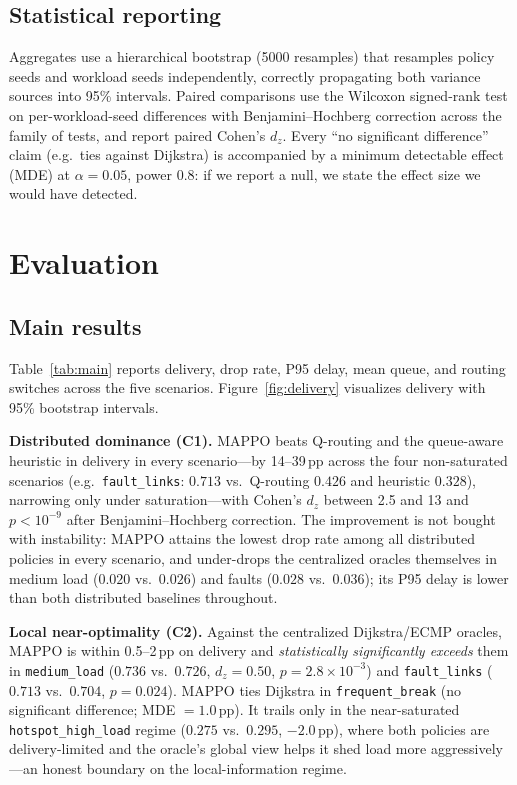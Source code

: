 \documentclass[conference,10pt]{IEEEtran}
\begin{document}
\subsection{Statistical reporting}
Aggregates use a hierarchical bootstrap (5000 resamples) that resamples policy seeds and workload seeds independently, correctly propagating both variance sources into 95\% intervals. Paired comparisons use the Wilcoxon signed-rank test on per-workload-seed differences with Benjamini--Hochberg correction across the family of tests, and report paired Cohen's $d_z$. Every ``no significant difference'' claim (e.g.\ ties against Dijkstra) is accompanied by a minimum detectable effect (MDE) at $\alpha=0.05$, power $0.8$: if we report a null, we state the effect size we would have detected.

\section{Evaluation}
\label{sec:eval}

\subsection{Main results}
Table~\ref{tab:main} reports delivery, drop rate, P95 delay, mean queue, and routing switches across the five scenarios. Figure~\ref{fig:delivery} visualizes delivery with 95\% bootstrap intervals.

\textbf{Distributed dominance (C1).} MAPPO beats Q-routing and the queue-aware heuristic in delivery in every scenario---by 14--39\,pp across the four non-saturated scenarios (e.g.\ \texttt{fault\_links}: $0.713$ vs.\ Q-routing $0.426$ and heuristic $0.328$), narrowing only under saturation---with Cohen's $d_z$ between 2.5 and 13 and $p<10^{-9}$ after Benjamini--Hochberg correction. The improvement is not bought with instability: MAPPO attains the lowest drop rate among all distributed policies in every scenario, and under-drops the centralized oracles themselves in medium load ($0.020$ vs.\ $0.026$) and faults ($0.028$ vs.\ $0.036$); its P95 delay is lower than both distributed baselines throughout.

\textbf{Local near-optimality (C2).} Against the centralized Dijkstra/ECMP oracles, MAPPO is within 0.5--2\,pp on delivery and \emph{statistically significantly exceeds} them in \texttt{medium\_load} ($0.736$ vs.\ $0.726$, $d_z=0.50$, $p=2.8\times10^{-3}$) and \texttt{fault\_links} ($0.713$ vs.\ $0.704$, $p=0.024$). MAPPO ties Dijkstra in \texttt{frequent\_break} (no significant difference; MDE $=1.0$\,pp). It trails only in the near-saturated \texttt{hotspot\_high\_load} regime ($0.275$ vs.\ $0.295$, $-2.0$\,pp), where both policies are delivery-limited and the oracle's global view helps it shed load more aggressively---an honest boundary on the local-information regime.
\end{document}
